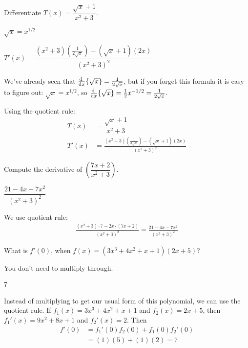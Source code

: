 \begin{Mquestion} Differentiate $T(x) = \dfrac{\sqrt{x}+1}{x^2+3}$.
\end{Mquestion}
\begin{hint} $\sqrt{x}=x^{1/2}$
\end{hint}
\begin{answer} $T'(x)=\dfrac{(x^2+3)\left(\frac{1}{2\sqrt{x}}\right)-(\sqrt{x}+1)(2x)}{(x^2+3)^2}$
\end{answer}
\begin{solution}
We've already seen that $\diff{}{x}\{\sqrt{x}\}=\frac{1}{2\sqrt{x}}$, but if you forget this formula it is easy to figure out: $\sqrt{x}=x^{1/2}$, so $\diff{}{x}\{\sqrt{x}\}=\frac{1}{2}x^{-1/2}=\frac{1}{2\sqrt{x}}$.

Using the quotient rule:
\begin{align*}
T(x) &= \dfrac{\sqrt{x}+1}{x^2+3}\\
T'(x)&=\frac{(x^2+3)\left(\frac{1}{2\sqrt{x}}\right)-(\sqrt{x}+1)(2x)}{(x^2+3)^2}
\end{align*}
\end{solution}


\begin{question}[2015Q]
Compute the derivative of $\left(\dfrac{7x+2}{x^2+3}\right)$.
\end{question}
\begin{answer}
$\dfrac{21-4x-7x^2}{(x^2+3)^2}$
\end{answer}
\begin{solution}
We use quotient rule:
\begin{align*}
\frac{(x^2+3)\cdot 7 - 2x\cdot (7x+2)}{(x^2+3)^2}=\frac{21 - 4x - 7x^2}{(x^2+3)^2}
\end{align*}
\end{solution}


\begin{question} What is $f'(0)$, when $f(x)=(3x^3+4x^2+x+1)(2x+5)$?
\end{question}
\begin{hint} You don't need to multiply through.
\end{hint}
\begin{answer} 7
\end{answer}
\begin{solution} Instead of multiplying to get our usual form of this polynomial, we can use the quotient rule. If $f_1(x)=3x^3+4x^2+x+1$ and $f_2(x)=2x+5$, then\\ $f_1'(x)=9x^2+8x+1$ and $f_2'(x)=2$. Then
\begin{align*}
f'(0)&=f_1'(0)f_2(0)+f_1(0)f_2'(0)\\
&=(1)(5)+(1)(2)=7\end{align*}
\end{solution}


